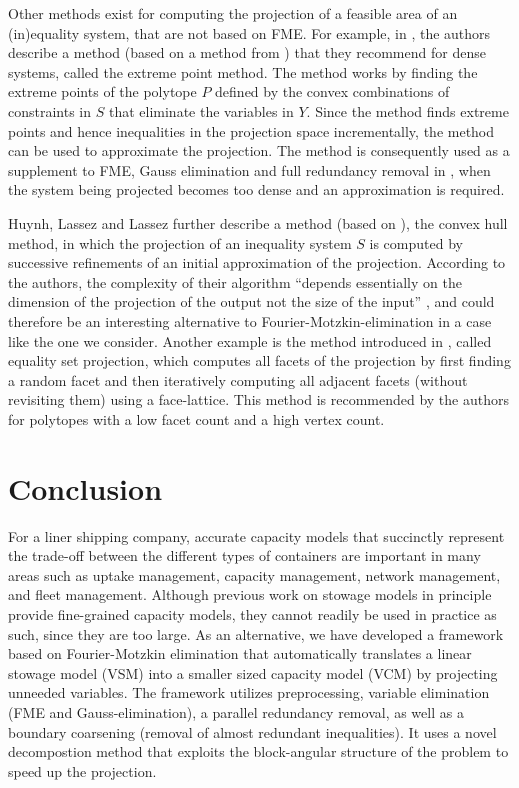 Other methods exist for computing the projection of a feasible area of an (in)equality system, that are not based on FME. For example, in \cite{huynh92}, the authors describe a method (based on a method from \cite{lassez90}) that they recommend for dense systems, called the extreme point method. The method works by finding the extreme points of the polytope $P$ defined by the convex combinations of constraints in $S$ that eliminate the variables in $Y$. Since the method finds extreme points and hence inequalities in the projection space incrementally, the method can be used to approximate the projection. The method is consequently used as a supplement to FME, Gauss elimination and full redundancy removal in \cite{simon05}, when the system being projected becomes too dense and an approximation is required.

Huynh, Lassez and Lassez \cite{huynh92} further describe a method (based on \cite{lassezlassez}), the convex hull method, in which the projection of an inequality system $S$ is computed by successive refinements of an initial approximation of the projection. According to the authors, the complexity of their algorithm ``depends essentially on the dimension of the projection of the output not the size of the input'' \cite{huynh92}, and could therefore be an interesting alternative to Fourier-Motzkin-elimination in a case like the one we consider. Another example is the method introduced in \cite{jones04}, called equality set projection, which computes all facets of the projection by first finding a random facet and then iteratively computing all adjacent facets (without revisiting them) {using a face-lattice}. 
This method is recommended by the authors for polytopes with a low facet count and a high vertex count.

\section{Conclusion}\label{sec:concl}
For a liner shipping company, accurate capacity models that succinctly represent the trade-off between the different types of containers are important in many areas such as uptake management, capacity management, network management, and fleet management. Although previous work on stowage models in principle provide fine-grained capacity models, they cannot readily be used in practice as such, since they are too large.
As an alternative, we have developed a framework based on Fourier-Motzkin elimination that automatically translates a linear stowage model (VSM) into a smaller sized capacity model (VCM) by projecting unneeded variables. The framework utilizes preprocessing, variable elimination (FME and Gauss-elimination), a parallel redundancy removal, as well as a boundary coarsening (removal of almost redundant inequalities). It uses a novel decompostion method that exploits the block-angular structure of the problem to speed up the projection.


